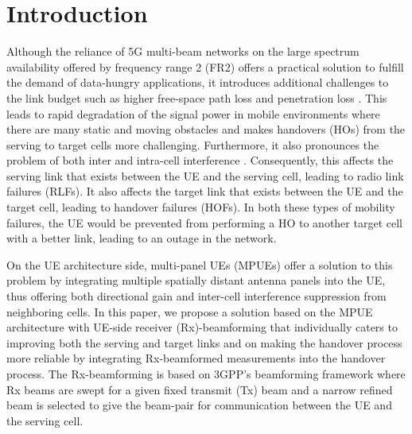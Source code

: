 \documentclass[10pt, conference]{IEEEtran}
\begin{document}

%
\vspace{-1mm}
\section{Introduction} \label{Section1}

Although the reliance of 5G multi-beam networks on the large spectrum availability offered by frequency range 2 (FR2) offers a practical solution to fulfill the demand of data-hungry applications, it introduces additional challenges to the link budget such as higher free-space path loss and penetration loss \cite{b1}. This leads to rapid degradation of the signal power in mobile environments where there are many static and moving obstacles and makes handovers (HOs) from the serving to target cells more challenging. Furthermore, it also pronounces the problem of both inter and intra-cell interference \cite{b2}. Consequently, this affects the serving link that exists between the UE and the serving cell, leading to radio link failures (RLFs). It also affects the target link that exists between the UE and the target cell, leading to handover failures (HOFs). In both these types of mobility failures, the UE would be prevented from performing a HO to another target cell with a better link, leading to an outage in the network.

On the UE architecture side, multi-panel UEs (MPUEs) \cite{b3, b4} offer a solution to this problem by integrating multiple spatially distant antenna panels into the UE, thus offering both directional gain and inter-cell interference suppression from neighboring cells. In this paper, we propose a solution based on the MPUE architecture with UE-side receiver (Rx)-beamforming that individually caters to improving both the serving and target links and on making the handover process more reliable by integrating Rx-beamformed measurements into the handover process. The Rx-beamforming is based on 3GPP's beamforming framework \cite[Section 6.1]{b5} where Rx beams are swept for a given fixed transmit (Tx) beam and a narrow refined beam is selected to give the beam-pair for communication between the UE and the serving cell. 
\end{document}
